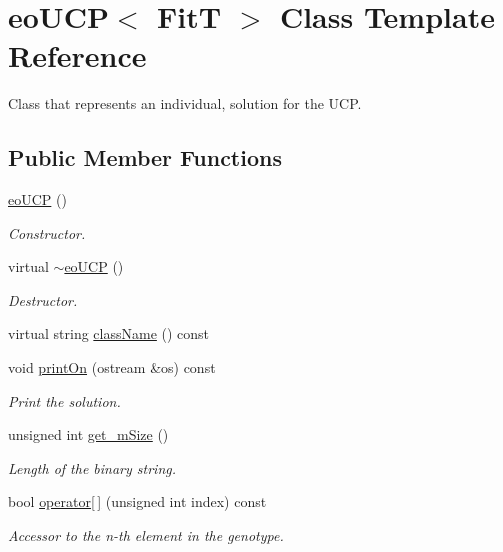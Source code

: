 \hypertarget{classeo_u_c_p}{\section{eo\-U\-C\-P$<$ \-Fit\-T $>$ \-Class \-Template \-Reference}
\label{classeo_u_c_p}
}


\-Class that represents an individual, solution for the \-U\-C\-P.  


\subsection*{\-Public \-Member \-Functions}
\begin{DoxyCompactItemize}
\item 
\hyperlink{classeo_u_c_p_a1a4aaa2cc49f728b03db33940059129e}{eo\-U\-C\-P} ()
\begin{DoxyCompactList}\small\item\em \-Constructor. \end{DoxyCompactList}\item 
virtual \hyperlink{classeo_u_c_p_abb4f10a882bcaab01faf9dadc0ae6c22}{$\sim$eo\-U\-C\-P} ()
\begin{DoxyCompactList}\small\item\em \-Destructor. \end{DoxyCompactList}\item 
virtual string \hyperlink{classeo_u_c_p_a9f0f36efde88307cc14ab130e1a490b1}{class\-Name} () const 
\item 
void \hyperlink{classeo_u_c_p_a49ea7917354481ffd19c8aeb2e786efb}{print\-On} (ostream \&os) const 
\begin{DoxyCompactList}\small\item\em \-Print the solution. \end{DoxyCompactList}\item 
unsigned int \hyperlink{classeo_u_c_p_acdfd1c5e517e84216d5a94d08a1b0538}{get\-\_\-m\-Size} ()
\begin{DoxyCompactList}\small\item\em \-Length of the binary string. \end{DoxyCompactList}\item 
bool \hyperlink{classeo_u_c_p_a023da18f27659a36062acaeecba5b0d1}{operator\mbox{[}$\,$\mbox{]}} (unsigned int index) const 
\begin{DoxyCompactList}\small\item\em \-Accessor to the n-\/th element in the genotype. \end{DoxyCompactList}\item 

\end{DoxyCompactItemize}
